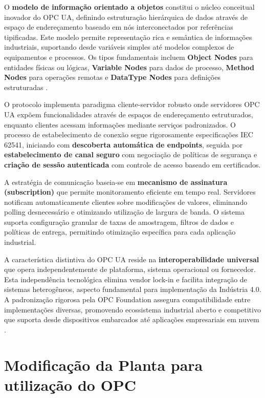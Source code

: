O \textbf{modelo de informação orientado a objetos} constitui o núcleo conceitual inovador do OPC UA, definindo estruturação hierárquica de dados através de espaço de endereçamento baseado em nós interconectados por referências tipificadas. Este modelo permite representação rica e semântica de informações industriais, suportando desde variáveis simples até modelos complexos de equipamentos e processos. Os tipos fundamentais incluem \textbf{Object Nodes} para entidades físicas ou lógicas, \textbf{Variable Nodes} para dados de processo, \textbf{Method Nodes} para operações remotas e \textbf{DataType Nodes} para definições estruturadas \cite{opc2025b}.

O protocolo implementa paradigma cliente-servidor robusto onde servidores OPC UA expõem funcionalidades através de espaços de endereçamento estruturados, enquanto clientes acessam informações mediante serviços padronizados. O processo de estabelecimento de conexão segue rigorosamente especificações IEC 62541, iniciando com \textbf{descoberta automática de endpoints}, seguida por \textbf{estabelecimento de canal seguro} com negociação de políticas de segurança e \textbf{criação de sessão autenticada} com controle de acesso baseado em certificados.

A estratégia de comunicação baseia-se em \textbf{mecanismo de assinatura (subscription)} que permite monitoramento eficiente em tempo real. Servidores notificam automaticamente clientes sobre modificações de valores, eliminando polling desnecessário e otimizando utilização de largura de banda. O sistema suporta configuração granular de taxas de amostragem, filtros de dados e políticas de entrega, permitindo otimização específica para cada aplicação industrial.

A característica distintiva do OPC UA reside na \textbf{interoperabilidade universal} que opera independentemente de plataforma, sistema operacional ou fornecedor. Esta independência tecnológica elimina vendor lock-in e facilita integração de sistemas heterogêneos, aspecto fundamental para implementação da Indústria 4.0. A padronização rigorosa pela OPC Foundation assegura compatibilidade entre implementações diversas, promovendo ecossistema industrial aberto e competitivo que suporta desde dispositivos embarcados até aplicações empresariais em nuvem \cite{opc2025b}.

\section{Modificação da Planta para utilização do OPC}
\label{sec:opcmodificado}

